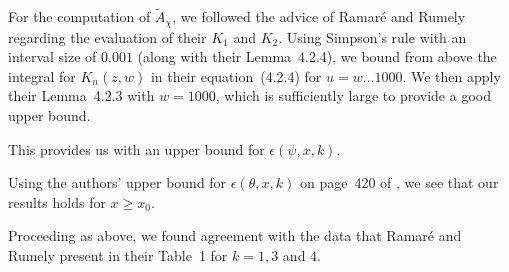 \documentclass{jT}
\theoremstyle{definition}
\begin{document}
For the computation of $\tilde{A}_{\chi}$, we followed the advice of Ramar\'{e} and
Rumely \cite[p.~414]{RR} regarding the evaluation of their $K_{1}$ and $K_{2}$.
Using Simpson's rule with an interval size of $0.001$ (along with their Lemma~4.2.4), we bound from
above the integral for $K_{n}(z,w)$ in their equation~(4.2.4) for $u=w \ldots 1000$. We then apply
their Lemma~4.2.3 with $w=1000$, which is sufficiently large to provide a good upper bound.

This provides us with an upper bound for $\epsilon(\psi, x, k)$.

Using the authors' upper bound for $\epsilon(\theta, x, k)$ on page~420 of \cite{RR},
we see that our results holds for $x \geq x_{0}$.

Proceeding as above, we found agreement with the data that Ramar\'{e} and Rumely present in their Table~1
for $k=1, 3$ and $4$.
\end{document}
